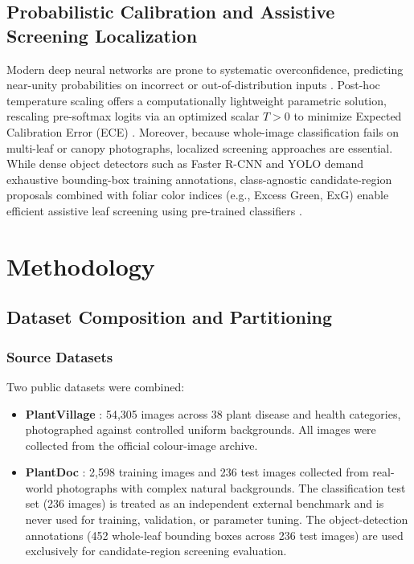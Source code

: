 \documentclass[pdflatex,sn-mathphys-num]{sn-jnl}
\theoremstyle{thmstyleone}%
\theoremstyle{thmstyletwo}%
\theoremstyle{thmstylethree}%
\begin{document}
\subsection{Probabilistic Calibration and Assistive Screening Localization}
Modern deep neural networks are prone to systematic overconfidence, predicting near-unity probabilities on incorrect or out-of-distribution inputs \citep{guo2017calibration}. Post-hoc temperature scaling offers a computationally lightweight parametric solution, rescaling pre-softmax logits via an optimized scalar $T > 0$ to minimize Expected Calibration Error (ECE) \citep{niculescu2005calibration,minderer2021calibration}. Moreover, because whole-image classification fails on multi-leaf or canopy photographs, localized screening approaches are essential. While dense object detectors such as Faster R-CNN \citep{ren2015fasterrcnn} and YOLO \citep{redmon2016yolo} demand exhaustive bounding-box training annotations, class-agnostic candidate-region proposals combined with foliar color indices (e.g., Excess Green, ExG) \citep{woebbecke1995color} enable efficient assistive leaf screening using pre-trained classifiers \citep{jiang2019realtime,he2021multiscale}.


\section{Methodology}
\label{sec:methodology}

\subsection{Dataset Composition and Partitioning}
\label{sec:dataset}

\subsubsection{Source Datasets}

Two public datasets were combined:
\begin{itemize}
  \item \textbf{PlantVillage} \citep{hughes2015plantvillage}: 54{,}305 images across
        38 plant disease and health categories, photographed against controlled uniform
        backgrounds. All images were collected from the official colour-image archive.
  \item \textbf{PlantDoc} \citep{singh2020plant}: 2{,}598 training images and 236 test
        images collected from real-world photographs with complex natural backgrounds.
        The classification test set (236 images) is treated as an independent external
        benchmark and is never used for training, validation, or parameter tuning.
        The object-detection annotations (452 whole-leaf bounding boxes across 236 test
        images) are used exclusively for candidate-region screening evaluation.
\end{itemize}
\end{document}

